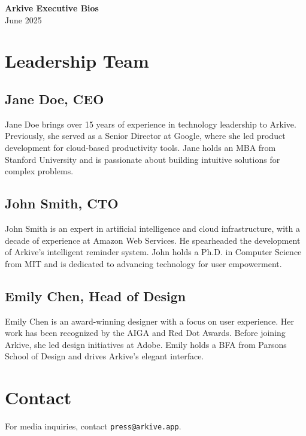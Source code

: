 \documentclass[11pt, a4paper]{article}
\begin{document}
\begin{center}
    {\LARGE\bfseries Arkive Executive Bios}\\[0.5cm]
    {\large June 2025}
\end{center}

\section{Leadership Team}

\subsection{Jane Doe, CEO}
Jane Doe brings over 15 years of experience in technology leadership to Arkive. Previously, she served as a Senior Director at Google, where she led product development for cloud-based productivity tools. Jane holds an MBA from Stanford University and is passionate about building intuitive solutions for complex problems.

\subsection{John Smith, CTO}
John Smith is an expert in artificial intelligence and cloud infrastructure, with a decade of experience at Amazon Web Services. He spearheaded the development of Arkive’s intelligent reminder system. John holds a Ph.D. in Computer Science from MIT and is dedicated to advancing technology for user empowerment.

\subsection{Emily Chen, Head of Design}
Emily Chen is an award-winning designer with a focus on user experience. Her work has been recognized by the AIGA and Red Dot Awards. Before joining Arkive, she led design initiatives at Adobe. Emily holds a BFA from Parsons School of Design and drives Arkive’s elegant interface.

\section{Contact}
For media inquiries, contact \texttt{press@arkive.app}.
\end{document}
